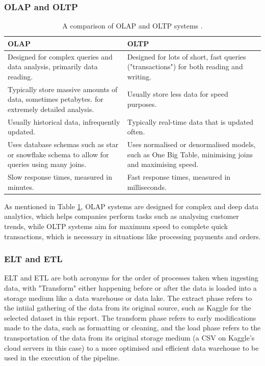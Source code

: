 \documentclass[12pt]{report}
\begin{document}
\subsubsection{OLAP and OLTP}

\begin{table}[H]
    \centering
        \begin{tabular}{ |p{}| p{}|}
            \hline
            \cellcolor{blue!25}OLAP & \cellcolor{blue!25}OLTP\\
            \hline
            Designed for complex queries and data analysis, primarily data reading.
            & Designed for lots of short, fast queries ("transactions") for both reading and writing.\\
            \hline
            Typically store massive amounts of data, sometimes petabytes.
            for extremely detailed analysis. 
            & Usually store less data for speed purposes.\\
            \hline
            Usually historical data, infrequently updated. 
            & Typically real-time data that is updated often.\\
            \hline 
            Uses database schemas such as star or snowflake schema to allow for queries using many joins. 
            & Uses normalised or denormalised models, such as One Big Table, minimising joins and maximising speed.\\
            \hline
            Slow response times, measured in minutes. 
            & Fast response times, measured in milliseconds.\\
            \hline
    \end{tabular}
    \caption{A comparison of OLAP and OLTP systems \autocite{aws_oltp_nodate}.}\label{tab:OLAP-OLTP}
\end{table}

As mentioned in Table \ref{tab:OLAP-OLTP}, OLAP systems are designed for complex and deep data analytics, which helps 
companies perform tasks such as analysing customer trends, while OLTP systems aim for maximum speed to complete quick transactions, 
which is necessary in situations like processing payments and orders.

\subsubsection{ELT and ETL}
ELT and ETL are both acronyms for the order of processes taken when ingesting data, with "Transform" either 
happening before or after the data is loaded into a storage medium like a data warehouse or data lake. 
The extract phase refers to the intiial gathering of the data from its original source, such as Kaggle for 
the selected dataset in this report. The transform phase refers to early modifications made to the data, such 
as formatting or cleaning, and the load phase refers to the transportation of the data from its original storage
medium (a CSV on Kaggle's cloud servers in this case) to a more optimised and efficient data warehouse to be used 
in the execution of the pipeline.
\end{document}
